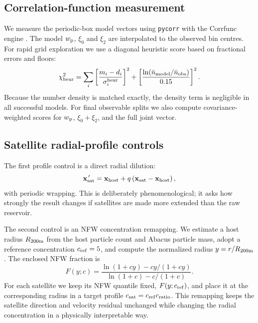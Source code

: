 \documentclass[fleqn,usenatbib]{mnras}
\newcommand{\wproj}{w_{\rm p}}
\newcommand{\xizero}{\xi_0}
\newcommand{\xitwo}{\xi_2}
\newcommand{\nbar}{\bar{n}}
\begin{document}
\subsection{Correlation-function measurement}

We measure the periodic-box model vectors using \texttt{pycorr} with the Corrfunc engine \citep{Sinha2020,Pycorr}.  The model $\wproj$, $\xizero$ and $\xitwo$ are interpolated to the observed bin centres.  For rapid grid exploration we use a diagonal heuristic score based on fractional errors and floors:
\begin{equation}
  \chi^2_{\rm heur}
  = \sum_i \left[\frac{m_i-d_i}{\sigma_i^{\rm heur}}\right]^2
  + \left[\frac{\ln(\nbar_{\rm model}/\nbar_{\rm obs})}{0.15}\right]^2.
\end{equation}
Because the number density is matched exactly, the density term is negligible in all successful models.  For final observable splits we also compute covariance-weighted scores for $\wproj$, $\xizero+\xitwo$, and the full joint vector.

\subsection{Satellite radial-profile controls}
\label{sec:profiles}

The first profile control is a direct radial dilution:
\begin{equation}
  {\bf x}_{\rm sat}^{\,\prime}
  =
  {\bf x}_{\rm host}
  + q\left({\bf x}_{\rm sat}-{\bf x}_{\rm host}\right),
  \label{eq:qprofile}
\end{equation}
with periodic wrapping.  This is deliberately phenomenological; it asks how strongly the result changes if satellites are made more extended than the raw reservoir.

The second control is an NFW concentration remapping.  We estimate a host radius $R_{200{\rm m}}$ from the host particle count and Abacus particle mass, adopt a reference concentration $c_{\rm ref}=5$, and compute the normalized radius $y=r/R_{200{\rm m}}$.  The enclosed NFW fraction is
\begin{equation}
  F(y;c) =
  \frac{\ln(1+cy)-cy/(1+cy)}
       {\ln(1+c)-c/(1+c)}.
  \label{eq:nfwcdf}
\end{equation}
For each satellite we keep its NFW quantile fixed, $F(y;c_{\rm ref})$, and place it at the corresponding radius in a target profile $c_{\rm sat}=c_{\rm ref}c_{\rm ratio}$.  This remapping keeps the satellite direction and velocity residual unchanged while changing the radial concentration in a physically interpretable way.
\end{document}
